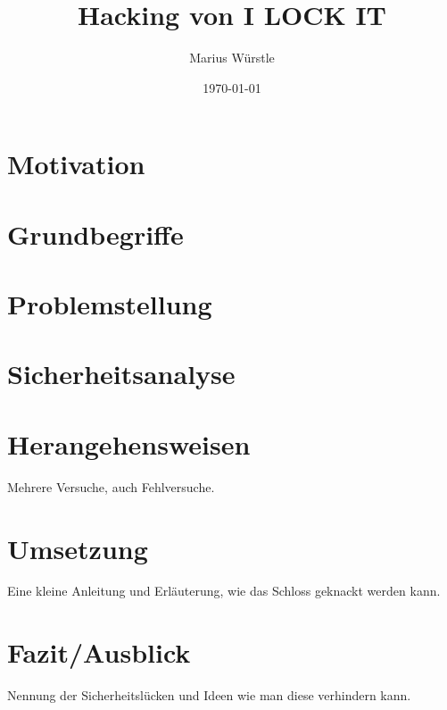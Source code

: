 \documentclass[a4paper,11pt,singlespacing]{article}
\title{Hacking von I LOCK IT}
\author{Marius Würstle}
\date{\today}
\begin{document}
	\setlength{\parindent}{0ex}
	\maketitle
	
	\tableofcontents
	\pagebreak
	
	\section{Motivation}
	
	\section{Grundbegriffe}
	
	\section{Problemstellung}
	
	\section{Sicherheitsanalyse}
	
	\section{Herangehensweisen}
		Mehrere Versuche, auch Fehlversuche.
	
	\section{Umsetzung}
		Eine kleine Anleitung und Erläuterung, wie das Schloss geknackt werden kann.
		
	\section{Fazit/Ausblick}
		Nennung der Sicherheitslücken und Ideen wie man diese verhindern kann.
	
	
\end{document}
